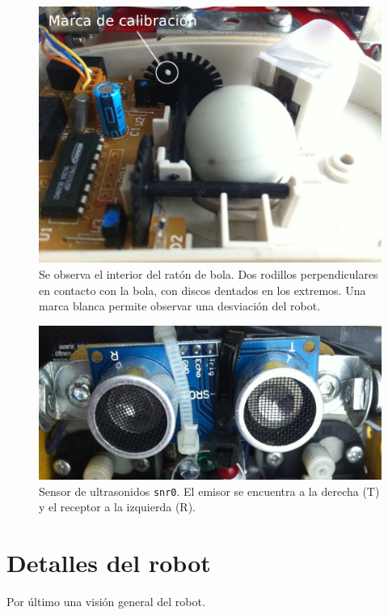 \documentclass[10pt,a4paper,hidelinks,twocolumn,nobalancelastpage]{article}
\begin{document}
\begin{figure}[H]
\includegraphics[width=\columnwidth]{bola.jpg}
\caption{Se observa el interior del ratón de bola. Dos rodillos perpendiculares 
en contacto con la bola, con discos dentados en los extremos. Una marca blanca 
permite observar una desviación del robot. \label{fig:bola}}
\end{figure}

\begin{figure}[H]
\includegraphics[width=\columnwidth]{snr0.jpg}
\caption{Sensor de ultrasonidos \texttt{snr0}. El emisor se encuentra a la 
derecha (T) y el receptor a la izquierda (R). \label{fig:snr0}}
\end{figure}


\section{Detalles del robot}
Por último una visión general del robot.
\end{document}
